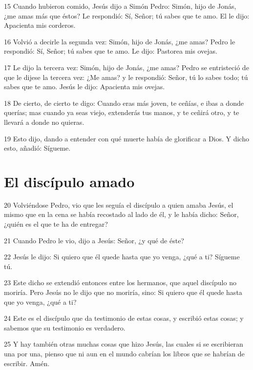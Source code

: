 \par 15 Cuando hubieron comido, Jesús dijo a Simón Pedro: Simón, hijo de Jonás, ¿me amas más que éstos? Le respondió: Sí, Señor; tú sabes que te amo. El le dijo: Apacienta mis corderos.
\par 16 Volvió a decirle la segunda vez: Simón, hijo de Jonás, ¿me amas? Pedro le respondió: Sí, Señor; tú sabes que te amo. Le dijo: Pastorea mis ovejas.
\par 17 Le dijo la tercera vez: Simón, hijo de Jonás, ¿me amas? Pedro se entristeció de que le dijese la tercera vez: ¿Me amas? y le respondió: Señor, tú lo sabes todo; tú sabes que te amo. Jesús le dijo: Apacienta mis ovejas.
\par 18 De cierto, de cierto te digo: Cuando eras más joven, te ceñías, e ibas a donde querías; mas cuando ya seas viejo, extenderás tus manos, y te ceñirá otro, y te llevará a donde no quieras.
\par 19 Esto dijo, dando a entender con qué muerte había de glorificar a Dios. Y dicho esto, añadió: Sígueme.

\section*{El discípulo amado}

\par 20 Volviéndose Pedro, vio que les seguía el discípulo a quien amaba Jesús, el mismo que en la cena se había recostado al lado de él, y le había dicho: Señor, ¿quién es el que te ha de entregar?
\par 21 Cuando Pedro le vio, dijo a Jesús: Señor, ¿y qué de éste?
\par 22 Jesús le dijo: Si quiero que él quede hasta que yo venga, ¿qué a ti? Sígueme tú.
\par 23 Este dicho se extendió entonces entre los hermanos, que aquel discípulo no moriría. Pero Jesús no le dijo que no moriría, sino: Si quiero que él quede hasta que yo venga, ¿qué a ti?
\par 24 Este es el discípulo que da testimonio de estas cosas, y escribió estas cosas; y sabemos que su testimonio es verdadero.
\par 25 Y hay también otras muchas cosas que hizo Jesús, las cuales si se escribieran una por una, pienso que ni aun en el mundo cabrían los libros que se habrían de escribir. Amén.


